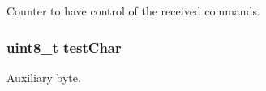 Counter to have control of the received commands. 

\hypertarget{group___devices___library_gae004df3f2b77e4d58eee171d2f76da40}{}
\subsubsection[{test\+Char}]{\setlength{\rightskip}{0pt plus 5cm}uint8\+\_\+t test\+Char}\label{group___devices___library_gae004df3f2b77e4d58eee171d2f76da40}


Auxiliary byte. 

